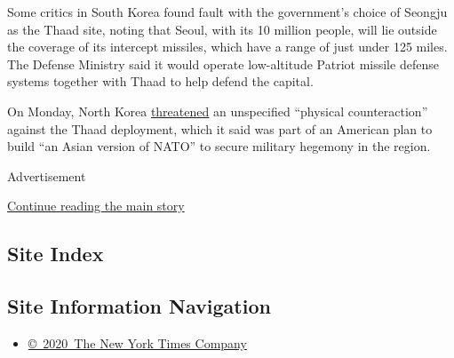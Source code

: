 Some critics in South Korea found fault with the government's choice of
Seongju as the Thaad site, noting that Seoul, with its 10 million
people, will lie outside the coverage of its intercept missiles, which
have a range of just under 125 miles. The Defense Ministry said it would
operate low-altitude Patriot missile defense systems together with Thaad
to help defend the capital.

On Monday, North Korea
\href{http://www.nytimes3xbfgragh.onion/2016/07/12/world/asia/north-korea-missile-defense-thaad.html}{threatened}
an unspecified ``physical counteraction'' against the Thaad deployment,
which it said was part of an American plan to build ``an Asian version
of NATO'' to secure military hegemony in the region.

Advertisement

\protect\hyperlink{after-bottom}{Continue reading the main story}

\hypertarget{site-index}{%
\subsection{Site Index}\label{site-index}}

\hypertarget{site-information-navigation}{%
\subsection{Site Information
Navigation}\label{site-information-navigation}}

\begin{itemize}
\tightlist
\item
  \href{https://help.nytimes3xbfgragh.onion/hc/en-us/articles/115014792127-Copyright-notice}{©~2020~The
  New York Times Company}
\end{itemize}

